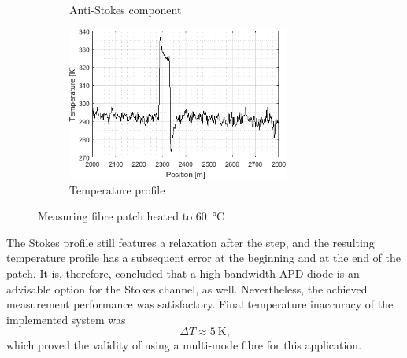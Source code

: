 \documentclass{standalone}
\begin{document}
\begin{figure}[h!]
\begin{subfigure}[b]{0.49\textwidth}
		\caption{Anti-Stokes component}
		\vspace{1em}
	\end{subfigure}
	\begin{subfigure}[b]{\textwidth}
		\centering
		\includegraphics[width=0.8\textwidth]{apd_60c_temp.png}
		\caption{Temperature profile}
		\label{fig:apd_60c_temp}
	\end{subfigure}
	\caption{Measuring fibre patch heated to \SI{60}{\celsius}}
	\label{fig:apd_60c}
\end{figure}
The Stokes profile still features a relaxation after the step, and the resulting temperature profile has a subsequent error at the beginning and at the end of the patch. It is, therefore, concluded that a high-bandwidth APD diode is an advisable option for the Stokes channel, as well. Nevertheless, the achieved measurement performance was satisfactory. Final temperature inaccuracy of the implemented system was
\begin{equation}
\varDelta T \approx \SI{5}{\kelvin} \textrm{,}
\end{equation}
which proved the validity of using a multi-mode fibre for this application. \\
\end{document}
